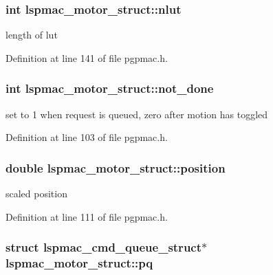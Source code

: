 \hypertarget{structlspmac__motor__struct_a11cbc6f50c150ed446e9a901cf7cc12b}{
\subsubsection[{nlut}]{\setlength{\rightskip}{0pt plus 5cm}int lspmac\-\_\-motor\-\_\-struct\-::nlut}}\label{structlspmac__motor__struct_a11cbc6f50c150ed446e9a901cf7cc12b}


length of lut 



Definition at line 141 of file pgpmac.\-h.

\hypertarget{structlspmac__motor__struct_ab7bd8bff48953ce05c758598d75877ac}{
\subsubsection[{not\-\_\-done}]{\setlength{\rightskip}{0pt plus 5cm}int lspmac\-\_\-motor\-\_\-struct\-::not\-\_\-done}}\label{structlspmac__motor__struct_ab7bd8bff48953ce05c758598d75877ac}


set to 1 when request is queued, zero after motion has toggled 



Definition at line 103 of file pgpmac.\-h.

\hypertarget{structlspmac__motor__struct_af8ffb3aed907d8664b65b37601954411}{
\subsubsection[{position}]{\setlength{\rightskip}{0pt plus 5cm}double lspmac\-\_\-motor\-\_\-struct\-::position}}\label{structlspmac__motor__struct_af8ffb3aed907d8664b65b37601954411}


scaled position 



Definition at line 111 of file pgpmac.\-h.

\hypertarget{structlspmac__motor__struct_ae0a0c9264f49f51bf72168c3b62f8723}{
\subsubsection[{pq}]{\setlength{\rightskip}{0pt plus 5cm}struct {\bf lspmac\-\_\-cmd\-\_\-queue\-\_\-struct}$\ast$ lspmac\-\_\-motor\-\_\-struct\-::pq}}\label{structlspmac__motor__struct_ae0a0c9264f49f51bf72168c3b62f8723}


